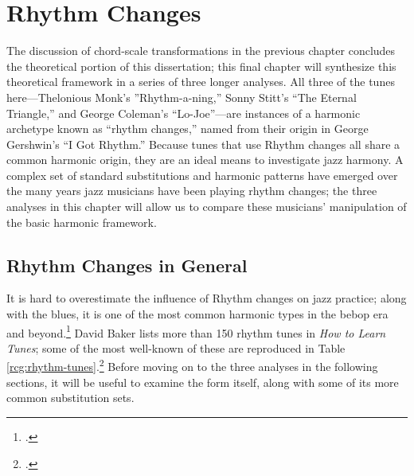 
\chapter{Rhythm Changes}
\label{chap:rhythm-changes}
\addtocspace

The discussion of chord-scale transformations in the previous chapter
concludes the theoretical portion of this dissertation; this final chapter
will synthesize this theoretical framework in a series of three longer
analyses. All three of the tunes here---Thelonious Monk's ''Rhythm-a-ning,''
Sonny Stitt's ``The Eternal Triangle,'' and George Coleman's ``Lo-Joe''---are
instances of a harmonic archetype known as ``rhythm changes,'' named from
their origin in George Gershwin's ``I Got Rhythm.'' Because tunes
that use Rhythm changes all share a common harmonic origin, they are an ideal
means to investigate jazz harmony. A complex set of standard substitutions and
harmonic patterns have emerged over the many years jazz musicians have been
playing rhythm changes; the three analyses in this chapter will allow us to
compare these musicians' manipulation of the basic harmonic framework.

\section{Rhythm Changes in General}
\label{sec:rhythm-changes-general}

It is hard to overestimate the influence of Rhythm changes on jazz practice;
along with the blues, it is one of the most common harmonic types in the bebop
era and beyond.\footcite[13]{owens:1995} David Baker lists more than 150
rhythm tunes in \emph{How to Learn Tunes}; some of the most well-known
of these are reproduced in Table
\ref{rcg:rhythm-tunes}.\footcite[42--44]{baker:tunes} Before moving on to the
three analyses in the following sections, it will be useful to examine the
form itself, along with some of its more common substitution sets.

